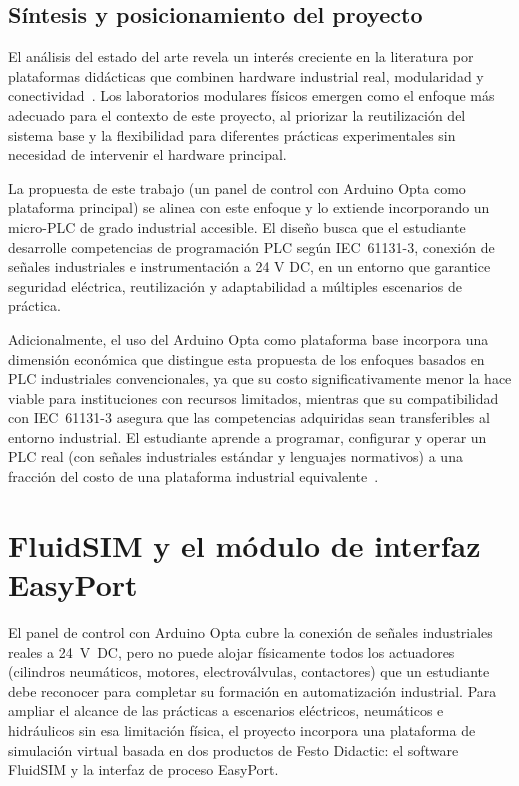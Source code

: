 \documentclass[12pt,a4paper,oneside]{report}
\begin{document}
\subsection{Síntesis y posicionamiento del proyecto}

El análisis del estado del arte revela un interés creciente en la literatura por plataformas didácticas que combinen hardware industrial real, modularidad y conectividad~\cite{ref3,ref4}. Los laboratorios modulares físicos emergen como el enfoque más adecuado para el contexto de este proyecto, al priorizar la reutilización del sistema base y la flexibilidad para diferentes prácticas experimentales sin necesidad de intervenir el hardware principal.

La propuesta de este trabajo (un panel de control con Arduino Opta como plataforma principal) se alinea con este enfoque y lo extiende incorporando un micro-PLC de grado industrial accesible. El diseño busca que el estudiante desarrolle competencias de programación PLC según IEC~61131-3, conexión de señales industriales e instrumentación a 24 V DC, en un entorno que garantice seguridad eléctrica, reutilización y adaptabilidad a múltiples escenarios de práctica.

Adicionalmente, el uso del Arduino Opta como plataforma base incorpora una dimensión económica que distingue esta propuesta de los enfoques basados en PLC industriales convencionales, ya que su costo significativamente menor la hace viable para instituciones con recursos limitados, mientras que su compatibilidad con IEC~61131-3 asegura que las competencias adquiridas sean transferibles al entorno industrial. El estudiante aprende a programar, configurar y operar un PLC real (con señales industriales estándar y lenguajes normativos) a una fracción del costo de una plataforma industrial equivalente~\cite{ref2,ref3}.

\section{FluidSIM y el módulo de interfaz EasyPort}
\label{sec:fluidsim_easyport}

El panel de control con Arduino Opta cubre la conexión de señales industriales reales a 24~V~DC, pero no puede alojar físicamente todos los actuadores (cilindros neumáticos, motores, electroválvulas, contactores) que un estudiante debe reconocer para completar su formación en automatización industrial. Para ampliar el alcance de las prácticas a escenarios eléctricos, neumáticos e hidráulicos sin esa limitación física, el proyecto incorpora una plataforma de simulación virtual basada en dos productos de Festo Didactic: el software FluidSIM y la interfaz de proceso EasyPort.
\end{document}
